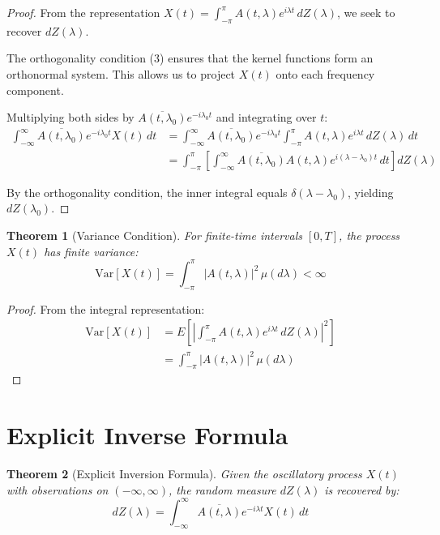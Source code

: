 \documentclass{article}
\newtheorem{theorem}{Theorem}
\newtheorem{theorem}{Theorem}
\begin{document}
\begin{proof}
From the representation $X(t) = \int_{-\pi}^{\pi} A(t,\lambda) e^{i\lambda t} \, dZ(\lambda)$, we seek to recover $dZ(\lambda)$.

The orthogonality condition (3) ensures that the kernel functions form an orthonormal system. This allows us to project $X(t)$ onto each frequency component.

Multiplying both sides by $\overline{A(t,\lambda_0)} e^{-i\lambda_0 t}$ and integrating over $t$:
\begin{align}
\int_{-\infty}^{\infty} \overline{A(t,\lambda_0)} e^{-i\lambda_0 t} X(t) \, dt &= \int_{-\infty}^{\infty} \overline{A(t,\lambda_0)} e^{-i\lambda_0 t} \int_{-\pi}^{\pi} A(t,\lambda) e^{i\lambda t} \, dZ(\lambda) \, dt \\
&= \int_{-\pi}^{\pi} \left[\int_{-\infty}^{\infty} \overline{A(t,\lambda_0)} A(t,\lambda) e^{i(\lambda-\lambda_0)t} \, dt\right] dZ(\lambda)
\end{align}

By the orthogonality condition, the inner integral equals $\delta(\lambda - \lambda_0)$, yielding $dZ(\lambda_0)$.
\end{proof}

\begin{theorem}[Variance Condition]
For finite-time intervals $[0,T]$, the process $X(t)$ has finite variance:
\begin{equation}
\text{Var}[X(t)] = \int_{-\pi}^{\pi} |A(t,\lambda)|^2 \, \mu(d\lambda) < \infty
\end{equation}
\end{theorem}

\begin{proof}
From the integral representation:
\begin{align}
\text{Var}[X(t)] &= E\left[\left|\int_{-\pi}^{\pi} A(t,\lambda) e^{i\lambda t} \, dZ(\lambda)\right|^2\right] \\
&= \int_{-\pi}^{\pi} |A(t,\lambda)|^2 \, \mu(d\lambda)
\end{align}
\end{proof}

\section{Explicit Inverse Formula}

\begin{theorem}[Explicit Inversion Formula]
Given the oscillatory process $X(t)$ with observations on $(-\infty, \infty)$, the random measure $dZ(\lambda)$ is recovered by:
\begin{equation}
dZ(\lambda) = \int_{-\infty}^{\infty} \overline{A(t,\lambda)} e^{-i\lambda t} X(t) \, dt
\end{equation}
\end{theorem}
\end{document}
